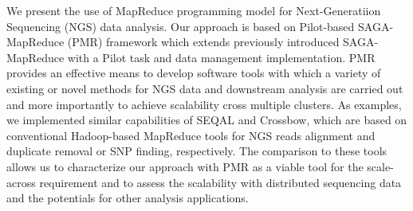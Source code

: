\documentclass{sig-alternate}
\begin{document}
\maketitle
\begin{abstract} 



 
\end{abstract}

We present the use of MapReduce programming model for Next-Generatiion Sequencing (NGS) data analysis.  Our approach is based on Pilot-based SAGA-MapReduce (PMR) framework which extends previously introduced SAGA-MapReduce with a Pilot task and data management implementation.  PMR provides an effective means to develop software tools with which a variety of existing or novel methods for NGS data and downstream analysis are carried out and more importantly to achieve scalability cross multiple clusters.  As examples, we implemented similar capabilities of SEQAL and Crossbow, which are based on conventional Hadoop-based MapReduce tools for NGS reads alignment and duplicate removal or SNP finding, respectively.   The comparison to these tools allows us to characterize our approach with PMR as a viable tool for the scale-across requirement and to assess the scalability with distributed sequencing data and the potentials for other analysis applications.  


 





\end{document}

